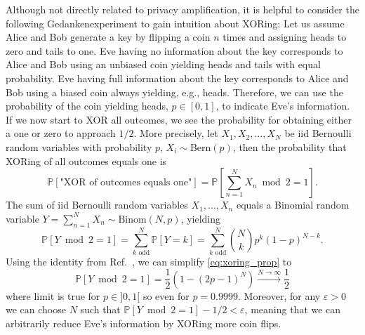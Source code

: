 Although not directly related to privacy amplification, it is helpful to consider the following Gedankenexperiment to gain intuition about XORing:
Let us assume Alice and Bob generate a key by flipping a coin $n$ times and assigning heads to zero and tails to one.
Eve having no information about the key corresponds to Alice and Bob using an unbiased coin yielding heads and tails with equal probability.
Eve having full information about the key corresponds to Alice and Bob using a biased coin always yielding, e.g., heads.
Therefore, we can use the probability of the coin yielding heads, $p\in[0,1]$, to indicate Eve's information.
If we now start to XOR all outcomes, we see the probability for obtaining either a one or zero to approach $1/2$.
More precisely, let $X_1,X_2,\dots,X_N$ be \gls{iid} Bernoulli random variables with probability $p$, $X_i\sim\text{Bern}(p)$, then the probability that XORing of all outcomes equals one is
\begin{equation}
	\mathbb{P}\left[
		\text{"XOR of outcomes equals one"}
	\right]
	=
	\mathbb{P}\left[
		\sum_{n=1}^NX_n\bmod2
		=
		1
	\right]
	.
\end{equation}
The sum of \gls{iid} Bernoulli random variables $X_1,\dots,X_n$ equals a Binomial random variable $Y=\sum_{n=1}^NX_n\sim\text{Binom}(N,p)$, yielding
\begin{equation}
	\mathbb{P}\left[
		Y\bmod2
		=
		1
	\right]
	=
	\sum^N_{k\text{ odd}}
	\mathbb{P}\left[Y=k\right]
	=
	\sum^N_{k\text{ odd}}
	\binom{N}{k}
	p^k(1-p)^{N-k}
	\label{eq:xoring_prop}
	.
\end{equation}
Using the identity from Ref.~\cite{stackexchange2528974}, we can simplify \cref{eq:xoring_prop} to
\begin{equation}
	\mathbb{P}\left[
		Y\bmod2
		=
		1
	\right]
	=
	\frac{1}{2}
	\left(
		1-(2p-1)^N
	\right)
	\xrightarrow{N\to\infty}
	\frac{1}{2}
\end{equation}
where limit is true for $p\in]0,1[$ so even for $p=0.9999$.
Moreover, for any $\varepsilon>0$ we can choose $N$ such that $\mathbb{P}\left[Y\bmod2=1\right]-1/2<\varepsilon$, meaning that we can arbitrarily reduce Eve's information by XORing more coin flips.

